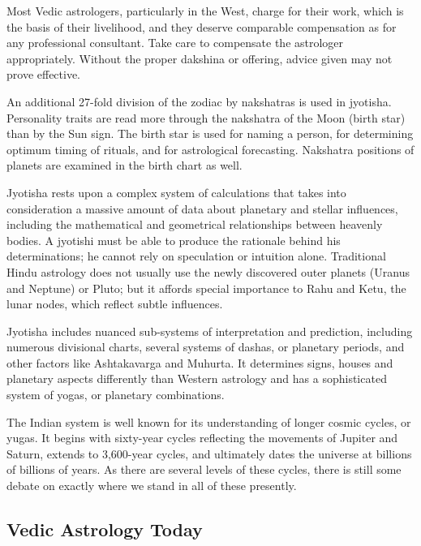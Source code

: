  

Most Vedic astrologers, particularly in the West, charge for their work, which is the basis of their livelihood, and they deserve comparable compensation as for any professional consultant. Take care to compensate the astrologer appropriately. Without the proper dakshina or offering, advice given may not prove effective.

 

An additional 27-fold division of the zodiac by nakshatras is used in jyotisha. Personality traits are read more through the nakshatra of the Moon (birth star) than by the Sun sign. The birth star is used for naming a person, for determining optimum timing of rituals, and for astrological forecasting. Nakshatra positions of planets are examined in the birth chart as well.

 

Jyotisha rests upon a complex system of calculations that takes into consideration a massive amount of data about planetary and stellar influences, including the mathematical and geometrical relationships between heavenly bodies. A jyotishi must be able to produce the rationale behind his determinations; he cannot rely on speculation or intuition alone. Traditional Hindu astrology does not usually use the newly discovered outer planets (Uranus and Neptune) or Pluto; but it affords special importance to Rahu and Ketu, the lunar nodes, which reflect subtle influences.

 

Jyotisha includes nuanced sub-systems of interpretation and prediction, including numerous divisional charts, several systems of dashas, or planetary periods, and other factors like Ashtakavarga and Muhurta. It determines signs, houses and planetary aspects differently than Western astrology and has a sophisticated system of yogas, or planetary combinations.

 

The Indian system is well known for its understanding of longer cosmic cycles, or yugas. It begins with sixty-year cycles reflecting the movements of Jupiter and Saturn, extends to 3,600-year cycles, and ultimately dates the universe at billions of billions of years. As there are several levels of these cycles, there is still some debate on exactly where we stand in all of these presently.

 

\subsection{Vedic Astrology Today}
 

